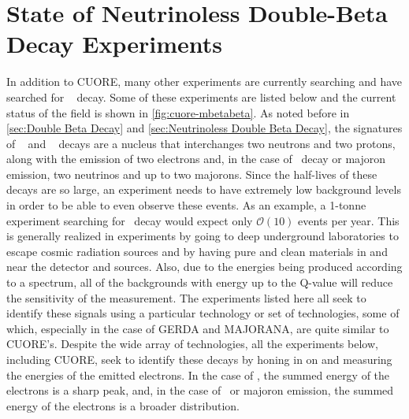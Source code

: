 \section{State of Neutrinoless Double-Beta Decay Experiments}
\label{sec:State of Neutrinoless Double Beta Decay Experiments}
In addition to CUORE, many other experiments are currently searching and have searched for \zeronubb~ decay. Some of these experiments are listed below and the current status of the field is shown in \autoref{fig:cuore-mbetabeta}.
As noted before in \autoref{sec:Double Beta Decay} and \autoref{sec:Neutrinoless Double Beta Decay}, the signatures of \zeronubb~ and \twonubb~ decays are a nucleus that interchanges two neutrons and two protons, along with the emission of two electrons and, in the case of \twonubb~decay or majoron emission, two neutrinos and up to two majorons.
Since the half-lives of these decays are so large, an experiment needs to have extremely low background levels in order to be able to even observe these events.
As an example, a 1-tonne experiment searching for \zeronubb~decay would expect only $\mathcal{O}(10)$ events per year.
This is generally realized in experiments by going to deep underground laboratories to escape cosmic radiation sources and by having pure and clean materials in and near the detector and sources.
Also, due to the energies being produced according to a spectrum, all of the backgrounds with energy up to the Q-value will reduce the sensitivity of the measurement.
The experiments listed here all seek to identify these signals using a particular technology or set of technologies, some of which, especially in the case of GERDA and MAJORANA, are quite similar to CUORE's.
Despite the wide array of technologies, all the experiments below, including CUORE, seek to identify these decays by honing in on and measuring the energies of the emitted electrons.
In the case of \zeronubb, the summed energy of the electrons is a sharp peak, and, in the case of \twonubb~or majoron emission, the summed energy of the electrons is a broader distribution.

